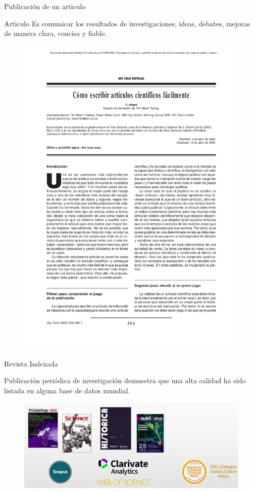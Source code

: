 \begin{frame}{Publicación de un articulo}
\begin{block}{Articulo}
Es comunicar los resultados de investigaciones, ideas, debates, mejoras de manera clara, concisa y fiable.
\end{block}  
\begin{figure}[H]
    \includegraphics[scale=0.09]{capitulos/articulo.png}
    \label{fig:boat1}
\end{figure}
\end{frame}


\begin{frame}{Revista Indexada}
\begin{block}{}
Publicación periódica de investigación demuestra que una alta calidad ha sido listada en alguna base de datos mundial.
\end{block}   
\begin{figure}[H]
    \includegraphics[scale=0.4]{capitulos/revistaindexada.png}
    \label{fig:boat1}
\end{figure}
\end{frame}

